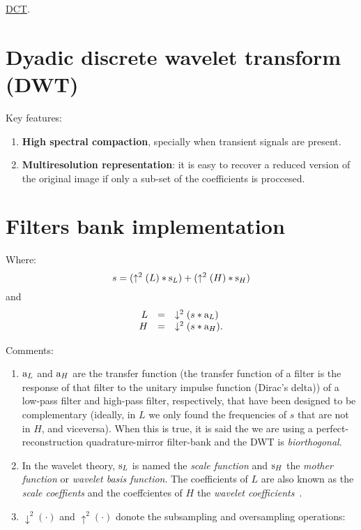 \href{https://nbviewer.jupyter.org/github/vicente-gonzalez-ruiz/image_transformations_for_coding/blob/master/DCT.ipynb}{DCT}.

\section{Dyadic discrete wavelet transform (DWT)}
Key features:

\begin{enumerate}
\tightlist
\item
  \textbf{High spectral compaction}, specially when transient signals
  are present.
\item
  \textbf{Multiresolution representation}: it is easy to recover a
  reduced version of the original image if only a sub-set of the
  coefficients is proccesed.
\end{enumerate}

\section{Filters bank implementation}
Where: \begin{equation}
  s = (\uparrow^2(L)*{\text s}_L) + (\uparrow^2(H)*{\text s}_H)
\end{equation} and \begin{equation}
  \begin{array}{rcl}
    L & = & \downarrow^2(s*{\text a}_L) \\
    H & = & \downarrow^2(s*{\text a}_H).
  \end{array}
\end{equation}

Comments:

\begin{enumerate}
\item
  \({\text a}_L\) and \({\text a}_H\) are the transfer function (the
  transfer function of a filter is the response of that filter to the
  unitary impulse function (Dirac's delta)) of a low-pass filter and
  high-pass filter, respectively, that have been designed to be
  complementary (ideally, in \(L\) we only found the frequencies of
  \(s\) that are not in \(H\), and viceversa). When this is true, it is
  said the we are using a perfect-reconstruction quadrature-mirror
  filter-bank and the DWT is \emph{biorthogonal}.
\item
  In the wavelet theory, \({\text s}_L\) is named the \emph{scale
  function} and \({\text s}_H\) the \emph{mother function} or
  \emph{wavelet basis function}. The coefficients of \(L\) are also
  known as the \emph{scale coeffients} and the coeffcientes of \(H\) the
  \emph{wavelet coefficients}~\cite{sovic2012signal}.
\item
  \(\downarrow^2(\cdot)\) and \(\uparrow^2(\cdot)\) donote the
  subsampling and oversampling operations:
\end{enumerate}

